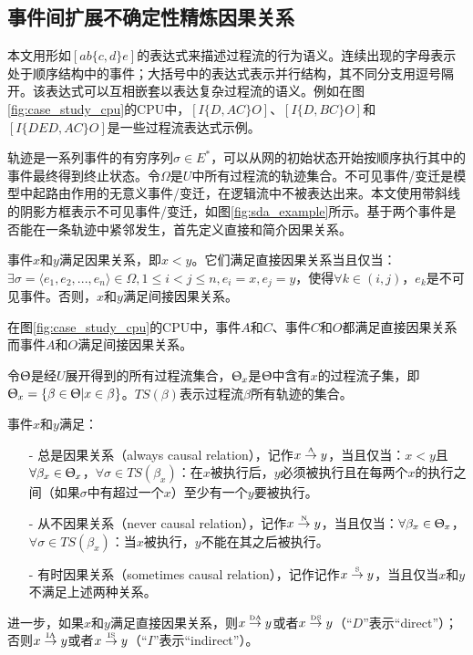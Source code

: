 \subsection{事件间扩展不确定性精炼因果关系}\label{subsec:exroru_event_causal}
本文用形如$[ab\{c,d\}e]$的表达式来描述过程流的行为语义。连续出现的字母表示处于顺序结构中的事件；大括号中的表达式表示并行结构，其不同分支用逗号隔开。该表达式可以互相嵌套以表达复杂过程流的语义。例如在图\ref{fig:case_study_cpu}的CPU中，$[I\{D,AC\}O]$、$[I\{D,BC\}O]$和$[I\{DED,AC\}O]$是一些过程流表达式示例。

轨迹是一系列事件的有穷序列$\sigma\in E^{*}$，可以从网的初始状态开始按顺序执行其中的事件最终得到终止状态。令$\Omega$是$U$中所有过程流的轨迹集合。不可见事件/变迁是模型中起路由作用的无意义事件/变迁，在逻辑流中不被表达出来\cite{wen2007mining}。本文使用带斜线的阴影方框表示不可见事件/变迁，如图\ref{fig:sda_example}所示。基于两个事件是否能在一条轨迹中紧邻发生，首先定义直接和简介因果关系。

\begin{definition}[直接和间接因果关系]\label{def:exroru_event_causal_direct}
事件$x$和$y$满足因果关系，即$x<y$。它们满足直接因果关系当且仅当：$\exists\sigma=\langle e_{1},e_{2},...,e_{n}\rangle\in\Omega,1\leq i<j\leq n,e_{i}=x,e_{j}=y$，使得$\forall k\in(i,j)$，$e_{k}$是不可见事件。否则，$x$和$y$满足间接因果关系。
\end{definition}

\begin{example}\label{ex:sda}
在图\ref{fig:case_study_cpu}的CPU中，事件$A$和$C$、事件$C$和$O$都满足直接因果关系而事件$A$和$O$满足间接因果关系。
\end{example}

令$\Uptheta$是经$U$展开得到的所有过程流集合，$\Uptheta_{x}$是$\Uptheta$中含有$x$的过程流子集，即$\Uptheta_{x}=\{\beta\in\Uptheta|x\in\beta\}$。$TS(\beta)$表示过程流$\beta$所有轨迹的集合。

\begin{definition}[事件间扩展不确定性精炼因果关系]\label{def:exroru_event_causal}
事件$x$和$y$满足：
  \begin{itemize}
  	\item[-] 总是因果关系（always causal relation），记作$x\overset{\text{\tiny{A}}}{\rightarrow}y$，当且仅当：$x<y$且$\forall\beta_{x}\in\Uptheta_{x}$，$\forall\sigma\in TS(\beta_{x})$：在$x$被执行后，$y$必须被执行且在每两个$x$的执行之间（如果$\sigma$中有超过一个$x$）至少有一个$y$要被执行。
  	\item[-] 从不因果关系（never causal relation），记作$x\overset{\text{\tiny{N}}}{\rightarrow}y$，当且仅当：$\forall\beta_{x}\in\Uptheta_{x}$，$\forall\sigma\in TS(\beta_{x})$：当$x$被执行，$y$不能在其之后被执行。
  	\item[-] 有时因果关系（sometimes causal relation），记作记作$x\overset{\text{\tiny{S}}}{\rightarrow}y$，当且仅当$x$和$y$不满足上述两种关系。
  \end{itemize}
进一步，如果$x$和$y$满足直接因果关系，则$x\overset{\text{\tiny{DA}}}{\rightarrow}y$或者$x\overset{\text{\tiny{DS}}}{\rightarrow}y$（“$D$”表示“direct”）；否则$x\overset{\text{\tiny{IA}}}{\rightarrow}y$或者$x\overset{\text{\tiny{IS}}}{\rightarrow}y$（“$I$”表示“indirect”）。
\end{definition}

